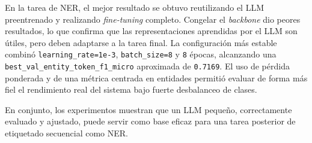 ﻿\documentclass[11pt,a4paper]{article}
\begin{document}
En la tarea de NER, el mejor resultado se obtuvo reutilizando el LLM preentrenado y realizando \textit{fine-tuning} completo. Congelar el \textit{backbone} dio peores resultados, lo que confirma que las representaciones aprendidas por el LLM son útiles, pero deben adaptarse a la tarea final. La configuración más estable combinó \texttt{learning\_rate=1e-3}, \texttt{batch\_size=8} y \texttt{8} épocas, alcanzando una \texttt{best\_val\_entity\_token\_f1\_micro} aproximada de \texttt{0.7169}. El uso de pérdida ponderada y de una métrica centrada en entidades permitió evaluar de forma más fiel el rendimiento real del sistema bajo fuerte desbalanceo de clases.

En conjunto, los experimentos muestran que un LLM pequeño, correctamente evaluado y ajustado, puede servir como base eficaz para una tarea posterior de etiquetado secuencial como NER.
\end{document}
